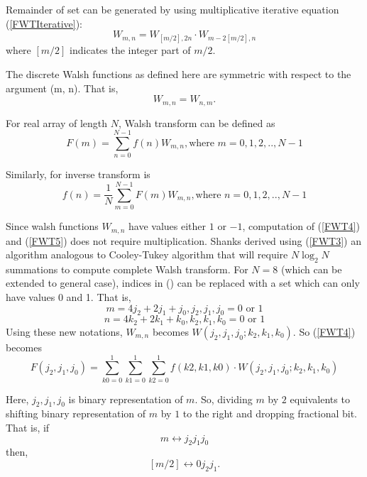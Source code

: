 Remainder of set can be generated by using multiplicative iterative equation (\ref{FWTIterative}): 
\begin{equation}
\label{FWT3}
W_{m,n} = W_{[m/2],2n}\cdot W_{m-2[m/2], n}
\end{equation}
where $[m/2]$ indicates the integer part of $m/2$.

The discrete Walsh functions as defined here are symmetric with respect to the argument (m, n). That is,
\[
W_{m, n} = W_{n,m}.
\]

For real array of length $N$, Walsh transform can be defined as 
\begin{equation}
\label{FWT4}
F(m) = \sum\limits_{n=0}^{N-1} f(n) W_{m,n}, \text{where $m = 0, 1, 2,.., N-1$}
\end{equation}

Similarly, for inverse transform is
\begin{equation}
\label{FWT5}
f(n) = \frac{1}{N}\sum\limits_{m=0}^{N-1} F(m) W_{m,n}, \text{where $n = 0, 1, 2,.., N-1$}
\end{equation}

Since walsh functions $W_{m,n}$ have values either $1$ or $-1$, computation of (\ref{FWT4}) and (\ref{FWT5}) does not require multiplication.
Shanks \cite{Shanks1969} derived using (\ref{FWT3}) an algorithm analogous to Cooley-Tukey algorithm that will require $N \log_2 N$ summations to compute complete Walsh transform. \linebreak
For $N = 8$ (which can be extended to general case),\linebreak
indices in () can be replaced with a set which can only have values 0 and 1. That is, 
\begin{equation}
\label{FWT6}
m = 4j_2 + 2j_1 + j_0, \text{$j_2, j_1, j_0 = 0$ or $1$}
\end{equation}
\begin{equation}
\label{FWT7}
n = 4k_2 + 2k_1 + k_0, \text{$k_2, k_1, k_0 = 0$ or $1$}
\end{equation}
Using these new notations, $W_{m,n}$ becomes $W(j_2,j_1,j_0;k_2,k_1,k_0)$. So (\ref{FWT4}) becomes 
\begin{equation}
\label{FWT8}
F(j_2,j_1,j_0) = \sum\limits_{k0 = 0}^1 \sum\limits_{k1 = 0}^1 \sum\limits_{k2 = 0}^1 f(k2,k1,k0) \cdot W(j_2,j_1,j_0;k_2,k_1,k_0)
\end{equation}

Here, $j_2,j_1,j_0$ is binary representation of $m$. So, dividing $m$ by $2$ equivalents to shifting binary representation of $m$ by $1$ to the right and dropping fractional bit. That is, if 
\[
m \leftrightarrow j_2j_1j_0
\]
then,
\[
[m/2] \leftrightarrow 0j_2j_1.
\]

